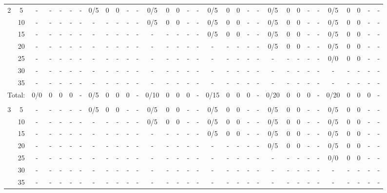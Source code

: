 \documentclass[a1paper]{article}
\begin{document}
\begin{tabular}{cc ccccc|ccccc|ccccc|ccccc|ccccc|ccccc}
\multirow{7}{*}{2} & 5 & - & - & - & - & - & 0/5 & 0 & 0 & - & - & 0/5 & 0 & 0 & - & - & 0/5 & 0 & 0 & - & - & 0/5 & 0 & 0 & - & - & 0/5 & 0 & 0 & - & -	\\ & 10 & - & - & - & - & -& - & - & - & - & - & 0/5 & 0 & 0 & - & - & 0/5 & 0 & 0 & - & - & 0/5 & 0 & 0 & - & - & 0/5 & 0 & 0 & - & -	\\ & 15 & - & - & - & - & -& - & - & - & - & -& - & - & - & - & - & 0/5 & 0 & 0 & - & - & 0/5 & 0 & 0 & - & - & 0/5 & 0 & 0 & - & -	\\ & 20 & - & - & - & - & -& - & - & - & - & -& - & - & - & - & -& - & - & - & - & - & 0/5 & 0 & 0 & - & - & 0/5 & 0 & 0 & - & -	\\ & 25 & - & - & - & - & -& - & - & - & - & -& - & - & - & - & -& - & - & - & - & -& - & - & - & - & - & 0/0 & 0 & 0 & - & -	\\ & 30 & - & - & - & - & -& - & - & - & - & -& - & - & - & - & -& - & - & - & - & -& - & - & - & - & -& - & - & - & - & -	\\ & 35 & - & - & - & - & -& - & - & - & - & -& - & - & - & - & -& - & - & - & - & -& - & - & - & - & -& - & - & - & - & -	\\\cline{3-32}
\multicolumn{2}{c}{Total:} & 0/0& 0& 0& 0 & - & 0/5& 0& 0& 0 & - & 0/10& 0& 0& 0 & - & 0/15& 0& 0& 0 & - & 0/20& 0& 0& 0 & - & 0/20& 0& 0& 0 & - \\\\
\multirow{7}{*}{3} & 5 & - & - & - & - & - & 0/5 & 0 & 0 & - & - & 0/5 & 0 & 0 & - & - & 0/5 & 0 & 0 & - & - & 0/5 & 0 & 0 & - & - & 0/5 & 0 & 0 & - & -	\\ & 10 & - & - & - & - & -& - & - & - & - & - & 0/5 & 0 & 0 & - & - & 0/5 & 0 & 0 & - & - & 0/5 & 0 & 0 & - & - & 0/5 & 0 & 0 & - & -	\\ & 15 & - & - & - & - & -& - & - & - & - & -& - & - & - & - & - & 0/5 & 0 & 0 & - & - & 0/5 & 0 & 0 & - & - & 0/5 & 0 & 0 & - & -	\\ & 20 & - & - & - & - & -& - & - & - & - & -& - & - & - & - & -& - & - & - & - & - & 0/5 & 0 & 0 & - & - & 0/5 & 0 & 0 & - & -	\\ & 25 & - & - & - & - & -& - & - & - & - & -& - & - & - & - & -& - & - & - & - & -& - & - & - & - & - & 0/0 & 0 & 0 & - & -	\\ & 30 & - & - & - & - & -& - & - & - & - & -& - & - & - & - & -& - & - & - & - & -& - & - & - & - & -& - & - & - & - & -	\\ & 35 & - & - & - & - & -& - & - & - & - & -& - & - & - & - & -& - & - & - & - & -& - & - & - & - & -& - & - & - & - & -	\\\cline{3-32}

\end{tabular}
\end{document}
